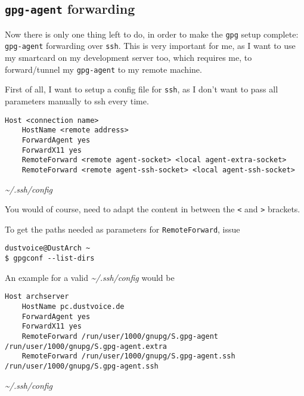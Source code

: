 \documentclass[10pt]{dustdoc}
\begin{document}
\subsection{\texttt{gpg-agent} forwarding}
\label{sec:gpg-agent-forwarding}

Now there is only one thing left to do, in order to make the \texttt{gpg} setup complete: \texttt{gpg-agent} forwarding over \texttt{ssh}.
This is very important for me, as I want to use my smartcard on my development server too, which requires me, to forward/tunnel my \texttt{gpg-agent} to my remote machine.

First of all, I want to setup a config file for \texttt{ssh}, as I don’t want to pass all parameters manually to ssh every time.

\begin{mintedlisting}
    \begin{verbatim}
Host <connection name>
    HostName <remote address>
    ForwardAgent yes
    ForwardX11 yes
    RemoteForward <remote agent-socket> <local agent-extra-socket>
    RemoteForward <remote agent-ssh-socket> <local agent-ssh-socket>
    \end{verbatim}

    \caption{\textit{\~{}/.ssh/config}}
\end{mintedlisting}

\begin{NOTE}
    You would of course, need to adapt the content in between the \texttt{<} and \texttt{>} brackets.

    To get the paths needed as parameters for \texttt{RemoteForward}, issue

    \begin{verbatim}
dustvoice@DustArch ~
$ gpgconf --list-dirs
    \end{verbatim}
\end{NOTE}

\begin{example}
    An example for a valid \textit{\~{}/.ssh/config} would be

    \begin{mintedlisting}
        \begin{verbatim}
Host archserver
    HostName pc.dustvoice.de
    ForwardAgent yes
    ForwardX11 yes
    RemoteForward /run/user/1000/gnupg/S.gpg-agent /run/user/1000/gnupg/S.gpg-agent.extra
    RemoteForward /run/user/1000/gnupg/S.gpg-agent.ssh /run/user/1000/gnupg/S.gpg-agent.ssh
        \end{verbatim}

        \caption{\textit{\~{}/.ssh/config}}
    \end{mintedlisting}
\end{example}
\end{document}
